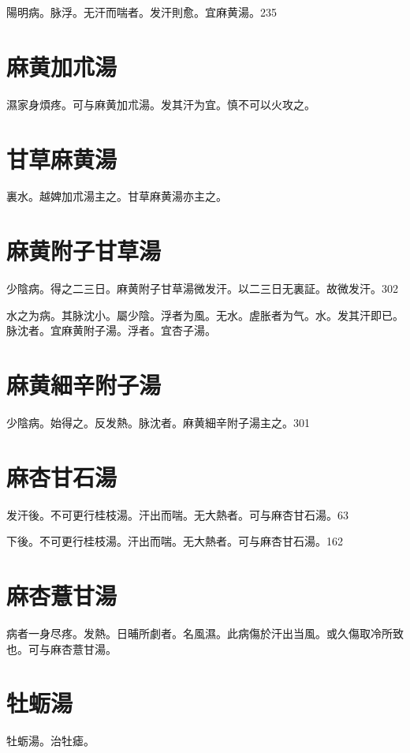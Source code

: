 \documentclass[b5paper,twoside,zihao=-4,UTF8]{ctexbook}
\begin{document}
陽明病。脉浮。无汗而喘者。发汗則愈。宜麻黄湯。235

\section{麻黄加朮湯}

濕家身煩疼。可与麻黄加朮湯。发其汗为宜。慎不可以火攻之。

\section{甘草麻黄湯}

裏水。越婢加朮湯主之。甘草麻黄湯亦主之。

\section{麻黄附子甘草湯}

少陰病。得之二三日。麻黄附子甘草湯微发汗。以二三日无{裏}証。故微发汗。302

水之为病。其脉沈小。屬少陰。浮者为風。无水。虗胀者为气。水。发其汗即已。脉沈者。宜麻黄附子湯。浮者。宜杏子湯。

\section{麻黄細辛附子湯}

少陰病。始得之。反发熱。脉沈者。麻黄細辛附子湯主之。301

\section{麻杏甘石湯}

发汗後。{不可更行桂枝湯。}汗出而喘。无大熱者。可与麻杏甘石湯。63

下後。{不可更行桂枝湯。}汗出而喘。无大熱者。可与麻杏甘石湯。162

\section{麻杏薏甘湯}

病者一身尽疼。发熱。日晡所劇者。名風濕。此病傷於汗出当風。或久傷取冷所致也。可与麻杏薏甘湯。

\section{牡蛎湯}

牡蛎湯。治牡瘧。
\end{document}
